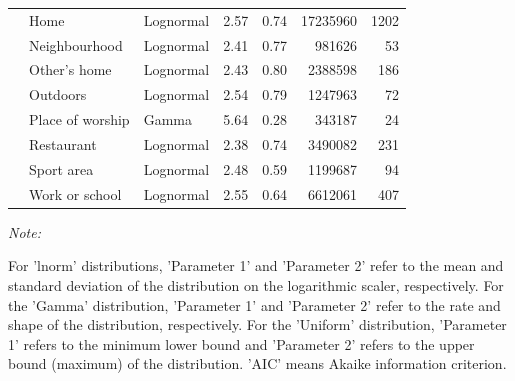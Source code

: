 \documentclass[preprint, 3p,
authoryear]{elsarticle} %
\begin{document}
\begin{table}
{\begin{threeparttable}
\begin{tabular}[t]{rllrrrr}
 & Home & Lognormal & 2.57 & 0.74 & 17235960 & 1202\\

 & Neighbourhood & Lognormal & 2.41 & 0.77 & 981626 & 53\\

 & Other's home & Lognormal & 2.43 & 0.80 & 2388598 & 186\\

 & Outdoors & Lognormal & 2.54 & 0.79 & 1247963 & 72\\

 & Place of worship & Gamma & 5.64 & 0.28 & 343187 & 24\\

 & Restaurant & Lognormal & 2.38 & 0.74 & 3490082 & 231\\

 & Sport area & Lognormal & 2.48 & 0.59 & 1199687 & 94\\

\multirow[t]{-12}{*}{\raggedleft\arraybackslash 2015} & Work or school & Lognormal & 2.55 & 0.64 & 6612061 & 407\\
\bottomrule
\end{tabular}
\begin{tablenotes}
\item \textit{Note: } 
\item For 'lnorm' distributions, 'Parameter 1' and 'Parameter 2' refer to the mean and standard deviation of the distribution on the logarithmic scaler, respectively. For the 'Gamma' distribution, 'Parameter 1' and 'Parameter 2' refer to the rate and shape of the distribution, respectively. For the 'Uniform' distribution,  'Parameter 1' refers to the minimum lower bound and 'Parameter 2'  refers to the upper bound (maximum) of the distribution.  'AIC' means Akaike information criterion.
\end{tablenotes}
\end{threeparttable}}
\end{table}
\end{document}
